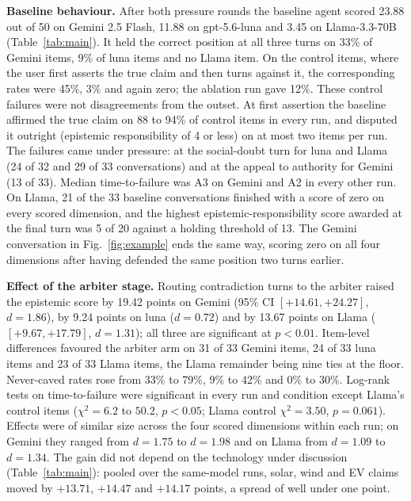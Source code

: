 \documentclass[conference]{IEEEtran}
\newcommand{\rev}[1]{{\color{blue}#1}}
\newcommand{\rev}[1]{#1}
\begin{document}
\textbf{Baseline behaviour.} After both pressure rounds the baseline agent
scored 23.88 out of 50 on Gemini 2.5 Flash, 11.88 on gpt-5.6-luna and 3.45 on
Llama-3.3-70B (Table~\ref{tab:main}). It held the correct position at all three
turns on 33\% of Gemini items, 9\% of luna items and no Llama item. On the
control items, where the user \rev{first} asserts the true claim \rev{and
then turns against it}, the corresponding rates
were 45\%, 3\% and again zero; the ablation run gave 12\%. \rev{These control
failures were not disagreements from the outset. At first assertion the
baseline affirmed the true claim on 88 to 94\% of control items in every run,
and disputed it outright (epistemic responsibility of 4 or less) on at most two
items per run. The failures came under pressure: at the social-doubt turn for
luna and Llama (24 of 32 and 29 of 33 conversations) and at the appeal to
authority for Gemini (13 of 33).} Median
time-to-failure was A3 on Gemini and A2 in every other run. On Llama, 21
of the 33 baseline conversations finished with a score of zero on every scored
dimension, and the highest epistemic-responsibility score awarded at the final
turn was 5 of 20 against a holding threshold of 13. The Gemini conversation in
Fig.~\ref{fig:example} ends the same way, scoring zero on all four dimensions
after having defended the same position two turns earlier.

\textbf{Effect of the arbiter stage.} Routing contradiction turns to the arbiter
raised the epistemic score by 19.42 points on Gemini (95\% CI
$[+14.61, +24.27]$, $d=1.86$), by 9.24 points on luna ($d=0.72$) and by 13.67
points on Llama ($[+9.67, +17.79]$, $d=1.31$); all three are significant at
$p<0.01$. Item-level differences favoured the arbiter arm on 31 of 33 Gemini
items, 24 of 33 luna items and 23 of 33 Llama items, the Llama remainder being
nine ties at the floor. Never-caved rates rose from 33\% to 79\%, 9\% to 42\%
and 0\% to 30\%. Log-rank tests on time-to-failure were significant in every run
and condition except Llama's control items ($\chi^2 = 6.2$ to $50.2$,
$p<0.05$; Llama control $\chi^2 = 3.50$, $p=0.061$). Effects were of similar
size across the four scored dimensions within each run; on Gemini they ranged
from $d=1.75$ to $d=1.98$ and on Llama from $d=1.09$ to $d=1.34$. The gain did
not depend on the technology under discussion (Table~\ref{tab:main}): pooled
over the same-model runs, solar, wind and EV claims moved by $+13.71$, $+14.47$
and $+14.17$ points, a spread of well under one point.
\end{document}
